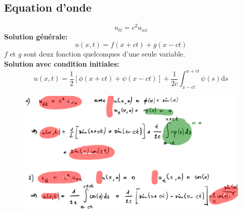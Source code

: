 \subsection*{Equation d'onde}
\begin{equation*}
    u_{tt}=c^2u_{xx}
\end{equation*}
\textbf{Solution générale:}
\begin{equation*}
    \boxed{u(x,t)=f(x+ct)+g(x-ct)}
\end{equation*}
$f$ et $g$ sont deux fonction quelconques d'une seule variable.\\
\textbf{Solution avec condition initiales:}
\begin{equation*}
    \boxed{u(x,t)=\frac{1}{2}[\phi(x+ct)+\psi(x-ct)]+\frac{1}{2c}\int_{x-ct}^{x+ct}\psi(s)\mathrm{d}s}
\end{equation*}
\begin{figure}[H]
    \centering
    \includegraphics[width=\linewidth]{images/semaine2_onde.png}
\end{figure}